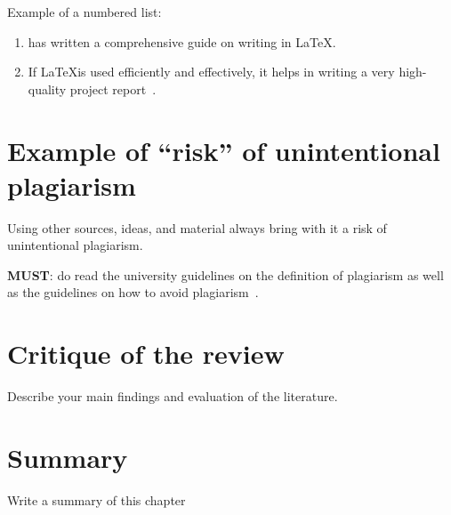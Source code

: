 \noindent 
Example of a numbered list:
\begin{enumerate}
    \item \cite{lamport1994latex} has written a comprehensive guide on writing in \LaTeX.
    \item If \LaTeX is used efficiently and effectively, it helps in writing a very high-quality project report~\citep{lamport1994latex}.   
\end{enumerate}

\section{Example of ``risk'' of unintentional plagiarism}
Using other sources, ideas, and material always bring with it a risk of unintentional plagiarism. 

\noindent
\textbf{\color{red}MUST}: do read the university guidelines on the definition of plagiarism as well as the guidelines on how to avoid plagiarism~\citep{uor_plagiarism}.




\section{Critique of the review} %
Describe your main findings and evaluation of the literature. ~\\

\section{Summary} 
Write a summary of this chapter~\\
